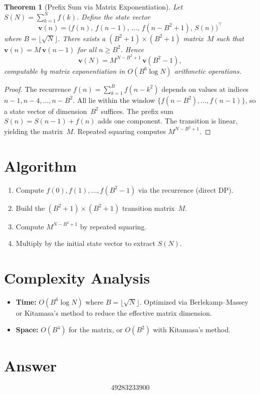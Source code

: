 \documentclass[11pt]{article}
\newtheorem{theorem}{Theorem}
\begin{document}
\begin{theorem}[Prefix Sum via Matrix Exponentiation]
Let $S(N) = \sum_{k=1}^{N} f(k)$. Define the state vector
\[
\mathbf{v}(n) = \bigl(f(n),\, f(n-1),\, \ldots,\, f(n - B^2 + 1),\, S(n)\bigr)^\top
\]
where $B = \lfloor \sqrt{N} \rfloor$. There exists a $(B^2 + 1) \times (B^2 + 1)$ matrix~$M$ such that $\mathbf{v}(n) = M\, \mathbf{v}(n-1)$ for all $n \ge B^2$. Hence
\[
\mathbf{v}(N) = M^{N - B^2 + 1}\, \mathbf{v}(B^2 - 1),
\]
computable by matrix exponentiation in $O(B^6 \log N)$ arithmetic operations.
\end{theorem}

\begin{proof}
The recurrence $f(n) = \sum_{k=1}^{B} f(n - k^2)$ depends on values at indices $n-1, n-4, \ldots, n-B^2$. All lie within the window $\{f(n - B^2), \ldots, f(n-1)\}$, so a state vector of dimension~$B^2$ suffices. The prefix sum $S(n) = S(n-1) + f(n)$ adds one component. The transition is linear, yielding the matrix~$M$. Repeated squaring computes $M^{N - B^2 + 1}$.
\end{proof}

\section{Algorithm}

\begin{enumerate}
\item Compute $f(0), f(1), \ldots, f(B^2 - 1)$ via the recurrence (direct DP).
\item Build the $(B^2 + 1) \times (B^2 + 1)$ transition matrix~$M$.
\item Compute $M^{N - B^2 + 1}$ by repeated squaring.
\item Multiply by the initial state vector to extract $S(N)$.
\end{enumerate}

\section{Complexity Analysis}

\begin{itemize}
    \item \textbf{Time:} $O(B^6 \log N)$ where $B = \lfloor\sqrt{N}\rfloor$. Optimized via Berlekamp--Massey or Kitamasa's method to reduce the effective matrix dimension.
    \item \textbf{Space:} $O(B^4)$ for the matrix, or $O(B^2)$ with Kitamasa's method.
\end{itemize}

\section{Answer}

\[
\boxed{49283233900}
\]
\end{document}
